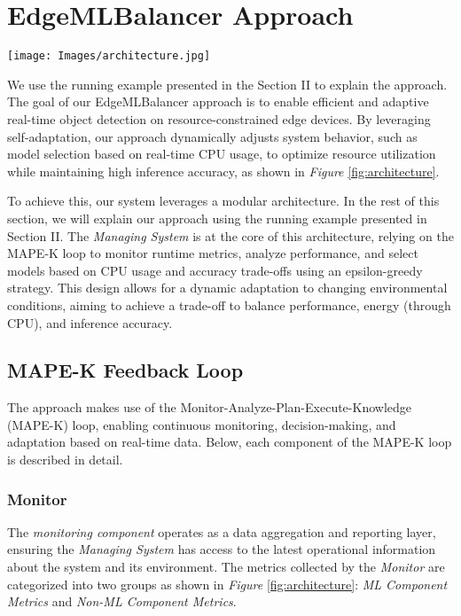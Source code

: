 \section{EdgeMLBalancer Approach}

\begin{figure*}[ht]
    \centering
    \texttt{[image: Images/architecture.jpg]}
    \caption{Architecture of EdgeMLBalancer}
    \label{fig:architecture}
\end{figure*}

We use the running example presented in the Section II to explain the approach. The goal of our EdgeMLBalancer approach is to enable efficient and adaptive real-time object detection on resource-constrained edge devices. By leveraging self-adaptation, our approach dynamically adjusts system behavior, such as model selection based on real-time CPU usage, to optimize resource utilization while maintaining high inference accuracy, as shown in \textit{Figure} \ref{fig:architecture}.

To achieve this, our system leverages a modular architecture. In the rest of this section, we will explain our approach using the running example presented in Section II. The \textit{Managing System} is at the core of this architecture, relying on the MAPE-K loop \cite{b13} to monitor runtime metrics, analyze performance, and select models based on CPU usage and accuracy trade-offs using an epsilon-greedy strategy. This design allows for a dynamic adaptation to changing environmental conditions, aiming to achieve a trade-off to balance performance, energy (through CPU), and inference accuracy.

\subsection{MAPE-K Feedback Loop}

The approach makes use of the Monitor-Analyze-Plan-Execute-Knowledge (MAPE-K) loop, enabling continuous monitoring, decision-making, and adaptation based on real-time data. Below, each component of the MAPE-K loop is described in detail.

\subsubsection{\textbf{Monitor}}

The \textit{monitoring component} operates as a data aggregation and reporting layer, ensuring the \textit{Managing System} has access to the latest operational information about the system and its environment. The metrics collected by the \textit{Monitor} are categorized into two groups as shown in \textit{Figure} \ref{fig:architecture}: \textit{ML Component Metrics} and \textit{Non-ML Component Metrics}. 

